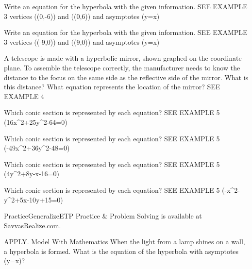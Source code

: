 \documentclass{article}
\newenvironment{practice}[2]{}{}        %
\newenvironment{te-addendum}[2]{}{}     %
\newcommand{\answer}[1]{}               %
\newcommand{\placeholder}[2]{}          %
\begin{document}
\begin{practice}{24}{1}
Write an equation for the hyperbola with the given information. SEE EXAMPLE 3
vertices ((0,-6)) and ((0,6)) and asymptotes (y=\pm{}x)
\answer{(\frac{y^2}{36}-\frac{x^2}{81}=1)}
\end{practice}
\begin{practice}{25}{1}
Write an equation for the hyperbola with the given information. SEE EXAMPLE 3
vertices ((-9,0)) and ((9,0)) and asymptotes (y=\pm{}x)
\answer{(\frac{x^2}{81}-\frac{y^2}{144}=1)}
\end{practice}
\begin{practice}{26}{2}
A telescope is made with a hyperbolic mirror, shown graphed on the coordinate plane. To assemble the telescope correctly, the manufacturer needs to know the distance to the focus on the same side as the reflective side of the mirror. What is this distance? What equation represents the location of the mirror? SEE EXAMPLE 4
\placeholder{graph}{Grid spacing 4, x from -8 to 28 and y from -28 to 8. Black arrowed x/y axes, O origin; labels x=8,16,24 and y=-16,-24. Red downward branch y=-sqrt(25+25x^2/144) with arrowheads and filled labeled points (0,-5) and (12,-sqrt(50)).}
\answer{(\frac{y^2}{25}-\frac{x^2}{144}=1); The focus is 8 units behind the mirror.}
\end{practice}
\begin{practice}{27}{1}
Which conic section is represented by each equation? SEE EXAMPLE 5
(16x^2+25y^2-64=0)
\answer{ellipse}
\end{practice}
\begin{practice}{28}{1}
Which conic section is represented by each equation? SEE EXAMPLE 5
(-49x^2+36y^2-48=0)
\answer{hyperbola}
\end{practice}
\begin{practice}{29}{1}
Which conic section is represented by each equation? SEE EXAMPLE 5
(4y^2+8y-x-16=0)
\answer{parabola}
\end{practice}
\begin{practice}{30}{1}
Which conic section is represented by each equation? SEE EXAMPLE 5
(-x^2-y^2+5x-10y+15=0)
\answer{circle}
\end{practice}
\begin{te-addendum}{Practice}{GeneralizeETP}
Practice & Problem Solving is available at SavvasRealize.com.
\end{te-addendum}
\begin{practice}{31}{2}
APPLY. Model With Mathematics When the light from a lamp shines on a wall, a hyperbola is formed. What is the equation of the hyperbola with asymptotes (y=\pm{}x)?
\placeholder{illustration}{Wall lamp illuminating a wooden wall upward in a hyperbolic region. Black horizontal/vertical axes with arrows cross at top of lamp; filled vertex on vertical axis labeled (0,2). No ticks or axis letters.}
\answer{(\frac{y^2}{4}-\frac{x^2}{25}=1)}
\end{practice}
\end{document}
